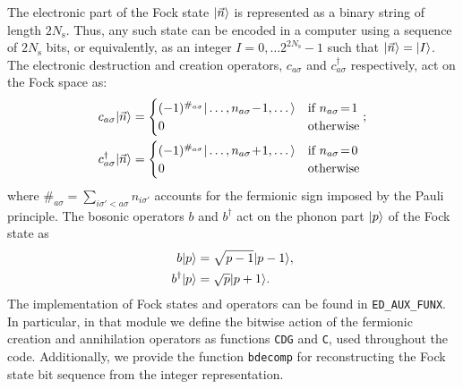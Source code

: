 \documentclass[edipack_sp.tex]{subfiles}
\begin{document}
The electronic part of the Fock state $|\vec{n}\rangle$ is represented
as a binary string of length $2N_\mathrm{s}$. Thus, any such state can be encoded
in a computer using a sequence of $2N_\mathrm{s}$ bits, or equivalently, as an integer $I=0,\dots 2^{2N_\mathrm{s}}-1$ such that $|\vec{n}\rangle=|I\rangle$.  
The electronic destruction and creation operators, $c_{a\sigma}$ and $c^\dagger_{a\sigma}$ 
respectively, act on the Fock space as:
\begin{align*}
  c_{a\sigma}\ket{\vec{n}} &=
    \begin{cases}
      (-1)^{\#_{a\sigma}}\ket{\dots,n_{a\sigma}\!-\!1,\dots}
      &\text{if $n_{a\sigma}\!=\! 1$}\\
      0 &\text{otherwise}
    \end{cases};\\
    c^\dagger_{a\sigma}\ket{\vec{n}} &=
     \begin{cases}
      (-1)^{\#_{a\sigma}}\ket{\dots,n_{a\sigma}\!+\!1,\dots}
      & \text{if $n_{a\sigma}\!=\! 0$}\\
      0 & \text{otherwise}
    \end{cases}    
\end{align*}
where $\#_{a\sigma}=\sum_{i\sigma'<a\sigma} n_{i\sigma'}$ accounts for the fermionic sign imposed by the Pauli principle.
The bosonic operators $b$ and $b^\dagger$ act on the phonon part $|p\rangle$ of the Fock state as
\begin{align*}
  b|p\rangle &= \sqrt{p-1}|p-1\rangle, \\
  b^\dagger|p\rangle &= \sqrt{p}|p+1\rangle.
\end{align*}
The implementation of Fock states and operators can be found in 
{\tt ED\_AUX\_FUNX}. In particular, in that module we define the bitwise action 
of the fermionic creation and annihilation operators as functions 
{\tt CDG} and {\tt C}, used throughout the code. 
Additionally, 
we provide the function {\tt bdecomp} for reconstructing the Fock  state bit sequence from the integer representation. 


\end{document}
